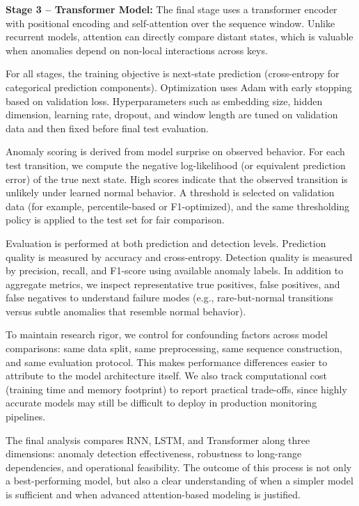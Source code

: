 \documentclass[12pt]{article}
\begin{document}
\textbf{Stage 3 -- Transformer Model:}
The final stage uses a transformer encoder with positional encoding and self-attention over the sequence window. Unlike recurrent models, attention can directly compare distant states, which is valuable when anomalies depend on non-local interactions across keys.

For all stages, the training objective is next-state prediction (cross-entropy for categorical prediction components). Optimization uses Adam with early stopping based on validation loss. Hyperparameters such as embedding size, hidden dimension, learning rate, dropout, and window length are tuned on validation data and then fixed before final test evaluation.

Anomaly scoring is derived from model surprise on observed behavior. For each test transition, we compute the negative log-likelihood (or equivalent prediction error) of the true next state. High scores indicate that the observed transition is unlikely under learned normal behavior. A threshold is selected on validation data (for example, percentile-based or F1-optimized), and the same thresholding policy is applied to the test set for fair comparison.

Evaluation is performed at both prediction and detection levels. Prediction quality is measured by accuracy and cross-entropy. Detection quality is measured by precision, recall, and F1-score using available anomaly labels. In addition to aggregate metrics, we inspect representative true positives, false positives, and false negatives to understand failure modes (e.g., rare-but-normal transitions versus subtle anomalies that resemble normal behavior).

To maintain research rigor, we control for confounding factors across model comparisons: same data split, same preprocessing, same sequence construction, and same evaluation protocol. This makes performance differences easier to attribute to the model architecture itself. We also track computational cost (training time and memory footprint) to report practical trade-offs, since highly accurate models may still be difficult to deploy in production monitoring pipelines.

The final analysis compares RNN, LSTM, and Transformer along three dimensions: anomaly detection effectiveness, robustness to long-range dependencies, and operational feasibility. The outcome of this process is not only a best-performing model, but also a clear understanding of when a simpler model is sufficient and when advanced attention-based modeling is justified.
\end{document}
